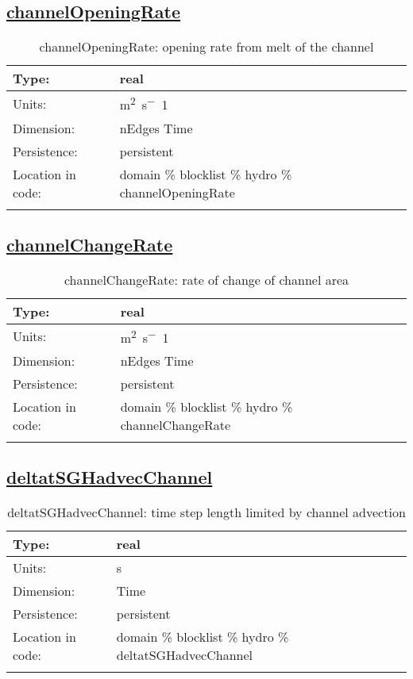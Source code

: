 \subsection[channelOpeningRate]{\hyperref[sec:var_tab_hydro]{channelOpeningRate}}
\label{subsec:var_sec_hydro_channelOpeningRate}
\begin{center}
\begin{longtable}{| p{2.0in} | p{4.0in} |}
        \hline 
        Type: & real \\
        \hline 
        Units: & \si{m^2.s^-1} \\
        \hline 
        Dimension: & nEdges Time \\
        \hline 
        Persistence: & persistent \\
        \hline 
         Location in code: & domain \% blocklist \% hydro \% channelOpeningRate \\
         \hline 
    \caption{channelOpeningRate: opening rate from melt of the channel}
\end{longtable}
\end{center}
\subsection[channelChangeRate]{\hyperref[sec:var_tab_hydro]{channelChangeRate}}
\label{subsec:var_sec_hydro_channelChangeRate}
\begin{center}
\begin{longtable}{| p{2.0in} | p{4.0in} |}
        \hline 
        Type: & real \\
        \hline 
        Units: & \si{m^2.s^-1} \\
        \hline 
        Dimension: & nEdges Time \\
        \hline 
        Persistence: & persistent \\
        \hline 
         Location in code: & domain \% blocklist \% hydro \% channelChangeRate \\
         \hline 
    \caption{channelChangeRate: rate of change of channel area}
\end{longtable}
\end{center}
\subsection[deltatSGHadvecChannel]{\hyperref[sec:var_tab_hydro]{deltatSGHadvecChannel}}
\label{subsec:var_sec_hydro_deltatSGHadvecChannel}
\begin{center}
\begin{longtable}{| p{2.0in} | p{4.0in} |}
        \hline 
        Type: & real \\
        \hline 
        Units: & \si{s} \\
        \hline 
        Dimension: & Time \\
        \hline 
        Persistence: & persistent \\
        \hline 
         Location in code: & domain \% blocklist \% hydro \% deltatSGHadvecChannel \\
         \hline 
    \caption{deltatSGHadvecChannel: time step length limited by channel advection}
\end{longtable}
\end{center}
